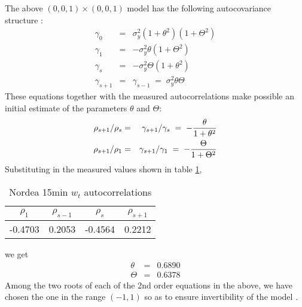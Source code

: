 \documentclass{book}
\begin{document}
The above $(0, 0, 1)\times(0, 0, 1)$ model has the following
autocovariance structure \cite{BoxJenkins94}:
\begin{eqnarray*}
  \gamma_0 &=& \sigma_y^2 (1 + \theta^2)(1 + \Theta^2) \\
  \gamma_1 &=& -\sigma_y^2\theta(1 + \Theta^2) \\
  \gamma_s &=& -\sigma_y^2\Theta(1 + \theta^2) \\
  \gamma_{s+1} &=& \gamma_{s-1}\;=\;\sigma_y^2\theta\Theta
\end{eqnarray*}
These equations together with the measured autocorrelations make
possible an initial estimate of the parameters $\theta$ and $\Theta$:
\begin{eqnarray*}
  {\rho_{s+1}/\rho_s} &=& {\gamma_{s+1}/\gamma_s} \;=\; -{\theta \over
    1 + \theta^2} \\
  {\rho_{s+1}/\rho_1} &=& {\gamma_{s+1}/\gamma_1} \;=\; -{\Theta \over
    1 + \Theta^2} \\
\end{eqnarray*}
Substituting in the measured values shown in table
\ref{tab:nordea_15min_w_acf},
\begin{table}[htb!]
  \centering
  \begin{tabular}{c|c|c|c}
    $\rho_1$ & $\rho_{s-1}$ & $\rho_s$ & $\rho_{s+1}$ \\
    \hline
    -0.4703 &  0.2053 & -0.4564 &  0.2212
  \end{tabular}
  \caption{Nordea 15min $w_t$ autocorrelations}
  \label{tab:nordea_15min_w_acf}
\end{table}
we get
\begin{eqnarray*}
  \theta &=& 0.6890 \\
  \Theta &=& 0.6378
\end{eqnarray*}
Among the two roots of each of the 2nd order equations in the above,
we have chosen the one in the range $(-1, 1)$ so as to ensure
invertibility of the model \cite{BoxJenkins94}.
\end{document}
